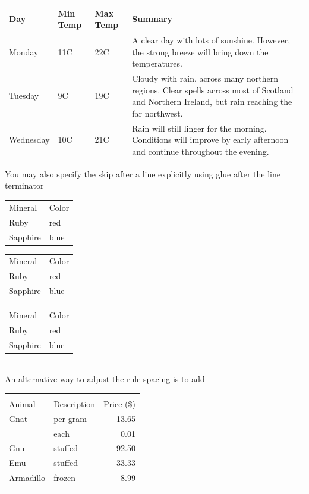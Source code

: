 \documentclass{article}
\begin{document}
\begin{center}
    \begin{tabular}{ | l | l | l | p{5cm} |}
    \hline
    Day & Min Temp & Max Temp & Summary \\ \hline
    Monday & 11C & 22C & A clear day with lots of sunshine.  
    However, the strong breeze will bring down the temperatures. \\ \hline
    Tuesday & 9C & 19C & Cloudy with rain, across many northern regions. Clear spells 
    across most of Scotland and Northern Ireland, 
    but rain reaching the far northwest. \\ \hline
    Wednesday & 10C & 21C & Rain will still linger for the morning. 
    Conditions will improve by early afternoon and continue 
    throughout the evening. \\
    \hline
    \end{tabular}
\end{center}
\pagebreak
You may also specify the skip after a line explicitly using glue after the line terminator\\
\begin{tabular}{ll}
\hline
Mineral & Color \\[1cm]
Ruby & red \\
Sapphire & blue \\
\hline
\end{tabular}

\setlength{\tabcolsep}{5pt}
\renewcommand{\arraystretch}{1.5}
\begin{tabular}{ll}
\hline
Mineral & Color \\[1cm]
Ruby & red \\
Sapphire & blue \\
\hline
\end{tabular}


\setlength{\tabcolsep}{100pt}
\renewcommand{\arraystretch}{1.5}
\begin{tabular}{ll}
\hline
Mineral & Color \\[1cm]
Ruby & red \\
Sapphire & blue \\
\hline
\end{tabular}\\
\pagebreak
An alternative way to adjust the rule spacing is to add %

\begin{tabular}{ | l | l | r | }
  \hline\noalign{\smallskip}
  \multicolumn{2}{c}{Item} \\
  \cline{1-2}\noalign{\smallskip}
  Animal & Description & Price (\$) \\
  \noalign{\smallskip}\hline\noalign{\smallskip}
  Gnat  & per gram & 13.65 \\
        & each     &  0.01 \\
  Gnu   & stuffed  & 92.50 \\
  Emu   & stuffed  & 33.33 \\
  Armadillo & frozen & 8.99 \\
  \noalign{\smallskip}\hline
\end{tabular}
\end{document}
